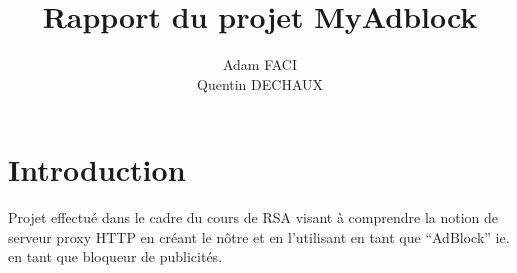 \documentclass[12 pt,a4paper,french]{article}
\title{Rapport du projet MyAdblock}
\author{Adam FACI \\ Quentin DECHAUX}
\begin{document}

\tableofcontents
\thispagestyle{empty}

\newpage
\setcounter{page}{1}

\section{Introduction}

\hspace{5mm}Projet effectué dans le cadre du cours de RSA visant à comprendre la notion de serveur proxy HTTP en créant le nôtre et en l'utilisant en tant que ``AdBlock'' ie. en tant que bloqueur de publicités.\\\par
\end{document}
